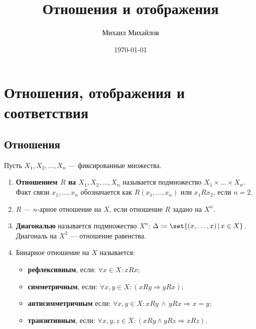 \documentclass{article}
\title{Отношения и отображения}
\author{Михаил Михайлов}
\date{\today}
\begin{document}
\maketitle
\tableofcontents
\newpage

\section{Отношения, отображения и соответствия}

\subsection{Отношения}
\begin{definition}
    \label{def:relation}
    Пусть \(X_1, X_2, \ldots, X_n\) --- фиксированные множества.
    
    \begin{enumerate}
        \item \textbf{Отношением \(R\) на \(X_1, X_2, \ldots, X_n\)} называется подмножество \(X_1 \times \ldots \times X_n\). Факт связи \(x_1, \ldots, x_n\) обозначается как \(R(x_1, \ldots, x_n)\) или \(x_1 R x_2\), если \(n = 2\).
        \item \(R\) --- \(n\)-арное отношение на \(X\), если отношение \(R\) задано на \(X^n\).
        \item \textbf{Диагональю} называется подмножество \(X^n\): \(\Delta \coloneq \set{(x,\ldots, x)\,|\, x \in X}\). Диагональ на \(X^2\) --- отношение равенства.
        \item Бинарное отношение на \(X\) называется:
            \begin{itemize}
                \item \textbf{рефлексивным}, если: \(\forall x \in X: x R x \);
                \item \textbf{симметричным}, если: \(\forall x, y \in X: (x R y \Rightarrow y R x)\);
                \item \textbf{антисимметричным} если: \(\forall x, y \in X: x R y \,\land\, y R x \Rightarrow x = y\);
                \item \textbf{транзитивным}, если: \(\forall x, y, z \in X: (x R y \land y R z \Rightarrow x R z)\).
            \end{itemize}
    \end{enumerate}
\end{definition}
    
\end{document}
